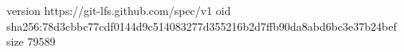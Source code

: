 version https://git-lfs.github.com/spec/v1
oid sha256:78d3cbbc77cdf0144d9c514083277d355216b2d7ffb90da8abd6bc3e37b24bef
size 79589
